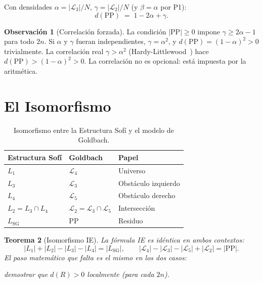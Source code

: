 \documentclass[11pt,a4paper]{article}
\newtheorem{theorem}{Teorema}
\theoremstyle{definition}
\newtheorem{remark}[theorem]{Observación}
\begin{document}
Con densidades $\alpha=|\mathcal{L}_3|/N$, $\gamma=|\mathcal{L}_2|/N$
(y $\beta=\alpha$ por P1):
\[
    d(\mathrm{PP}) \;=\; 1-2\alpha+\gamma.
\]

\begin{remark}[Correlación forzada]
La condición $|\mathrm{PP}|\geq0$ impone $\gamma\geq2\alpha-1$ para todo $2n$.
Si $\alpha$ y $\gamma$ fueran independientes, $\gamma=\alpha^2$, y
$d(\mathrm{PP})=(1-\alpha)^2>0$ trivialmente.  La correlación real
$\gamma>\alpha^2$ (Hardy-Littlewood~\cite{hl1923}) hace $d(\mathrm{PP})>(1-\alpha)^2>0$.
La correlación no es opcional: está impuesta por la aritmética.
\end{remark}

\section{El Isomorfismo}

\begin{table}[h]
\centering
\renewcommand{\arraystretch}{1.3}
\begin{tabular}{lll}
\toprule
\textbf{Estructura Sofí} & \textbf{Goldbach} & \textbf{Papel}\\
\midrule
$L_1$ & $\mathcal{L}_4$ & Universo\\
$L_3$ & $\mathcal{L}_3$ & Obstáculo izquierdo\\
$L_4$ & $\mathcal{L}_5$ & Obstáculo derecho\\
$L_2=L_3\cap L_4$ & $\mathcal{L}_2=\mathcal{L}_3\cap\mathcal{L}_5$ & Intersección\\
$L_{\mathrm{SG}}$ & PP & Residuo\\
\bottomrule
\end{tabular}
\caption{Isomorfismo entre la Estructura Sofí y el modelo de Goldbach.}
\label{tab:iso}
\end{table}

\begin{theorem}[Isomorfismo IE]\label{thm:iso}
La fórmula IE es idéntica en ambos contextos:
\[
    |L_1|+|L_2|-|L_3|-|L_4| = |L_{\mathrm{SG}}|,\qquad
    |\mathcal{L}_4|-|\mathcal{L}_3|-|\mathcal{L}_5|+|\mathcal{L}_2| = |\mathrm{PP}|.
\]
El paso matemático que falta es el mismo en los dos casos:
\begin{center}
\emph{demostrar que $d(R)>0$ localmente (para cada $2n$).}
\end{center}
\end{theorem}
\end{document}
